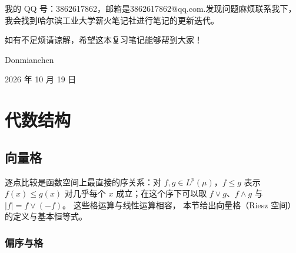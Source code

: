 \documentclass[oneside]{book}
\theoremstyle{definition}
\theoremstyle{definition}
\begin{document}
	
	我的 QQ 号：3862617862，邮箱是3862617862@qq.com.发现问题麻烦联系我下，我会找到哈尔滨工业大学薪火笔记社进行笔记的更新迭代。
	
	如有不足烦请谅解，希望这本复习笔记能够帮到大家！
	
	\hfill Donmianchen
	
	\hfill 2026 年 10 月 19 日
	


	
	
	\tableofcontents
	
	
	
	\part{代数结构}
	\chapter{向量格}
	
	逐点比较是函数空间上最直接的序关系：对 $f,g\in L^{p}(\mu)$，$f\leqslant g$ 表示 $f(x)\leqslant g(x)$ 对几乎每个 $x$ 成立；在这个序下可以取 $f\vee g$、$f\wedge g$ 与 $|f|=f\vee(-f)$。
	这些格运算与线性运算相容，%
	本节给出向量格（Riesz 空间）的定义与基本恒等式。%
	
	\section{偏序与格}
	
\end{document}
